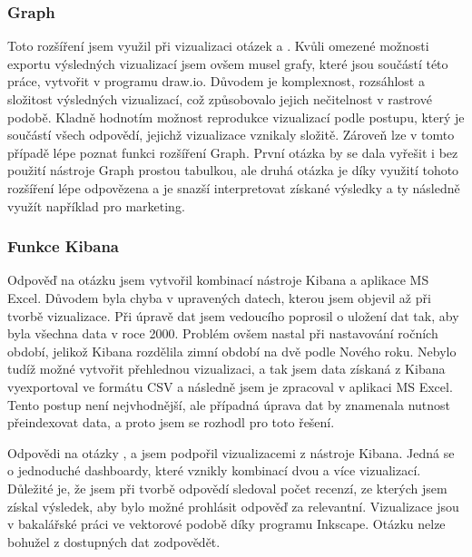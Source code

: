 \documentclass[czech,BP]{thesiskiv}
\begin{document}
\subsubsection{Graph}
Toto rozšíření jsem využil při vizualizaci otázek  a . Kvůli omezené možnosti exportu výsledných vizualizací jsem ovšem musel grafy, které jsou součástí této práce, vytvořit v  programu draw.io. Důvodem je komplexnost, rozsáhlost a složitost výsledných vizualizací, což způsobovalo jejich nečitelnost v rastrové podobě. Kladně hodnotím možnost reprodukce vizualizací podle postupu, který je součástí všech odpovědí, jejichž vizualizace vznikaly složitě. Zároveň lze v tomto případě lépe poznat funkci rozšíření Graph. První otázka by se dala vyřešit i bez použití nástroje Graph prostou tabulkou, ale druhá otázka je díky využití tohoto rozšíření lépe odpovězena a je snazší interpretovat získané výsledky a ty následně využít například pro marketing.

\subsubsection{Funkce Kibana}
\label{subsub:Fce Kibana}
Odpověď na otázku  jsem vytvořil kombinací nástroje Kibana a aplikace MS Excel. Důvodem byla chyba v upravených datech, kterou jsem objevil až při tvorbě vizualizace. Při úpravě dat jsem vedoucího poprosil o uložení dat tak, aby byla všechna data v roce 2000. Problém ovšem nastal při nastavování ročních období, jelikož Kibana rozdělila zimní období na dvě podle Nového roku. Nebylo tudíž možné vytvořit přehlednou vizualizaci, a tak jsem data získaná z Kibana vyexportoval ve formátu CSV a následně jsem je zpracoval v aplikaci MS Excel. Tento postup není nejvhodnější, ale případná úprava dat by znamenala nutnost přeindexovat data, a proto jsem se rozhodl pro toto řešení.

Odpovědi na otázky ,  a  jsem podpořil vizualizacemi z nástroje Kibana. Jedná se o jednoduché dashboardy, které vznikly kombinací dvou a více vizualizací. Důležité je, že jsem při tvorbě odpovědí sledoval počet recenzí, ze kterých jsem získal výsledek, aby bylo možné prohlásit odpověď za relevantní. Vizualizace jsou v bakalářské práci ve vektorové podobě díky programu Inkscape. Otázku  nelze bohužel z dostupných dat zodpovědět.
\end{document}
